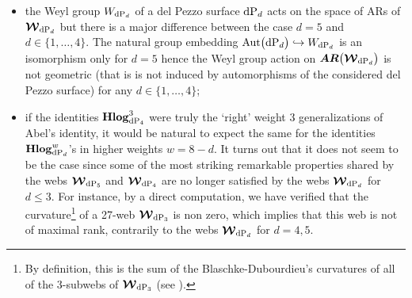 \documentclass[11pt]{amsart}
\newcommand{\mk}{\medskip}
\begin{document}
\begin{itemize}
{ $\pm F= G\circ \gamma$ for some  projective automorphism $\gamma \in {\rm Aut}(\mathbf P^1)={\bf PGL}_2(\mathbf C)$.}
 \mk 
\item[$-$] the Weyl group ${W}_{ {\rm dP}_d } $ of a del Pezzo surface ${\rm dP}_d$ acts on the space of ARs of  $\boldsymbol{\mathcal W}_{ {\rm dP}_d }$ but there is a major difference between the case $d=5$ and 
$d\in \{1,\ldots,4\}$. 
 The natural group embedding ${\rm Aut}\big({\rm dP}_d\big)\hookrightarrow {W}_{ {\rm dP}_d }$ is an  isomorphism only for $d=5$ hence the Weyl group action on $\boldsymbol{AR}\big( \boldsymbol{\mathcal W}_{ {\rm dP}_d }
\big)$ is not geometric (that is is not induced by automorphisms of the considered del Pezzo surface)  
for any $d\in \{1,\ldots,4\}$;
 \mk 
\item[$-$]  if the identities ${\bf Hlog}^{3}_{ {\rm dP}_4}$ were truly the `right' weight 3 generalizations of Abel's identity, it would be natural to expect the same for  the  identities ${\bf Hlog}^{w}_{ {\rm dP}_d}$'s in higher weights 
 $w=8-d$. It turns out that it does not seem to be the case since some of the most striking  remarkable properties shared by the webs $\boldsymbol{\mathcal W}_{ {\rm dP}_5}$ and 
$\boldsymbol{\mathcal W}_{ {\rm dP}_4 }$ 
are no longer satisfied by the webs $\boldsymbol{\mathcal W}_{ {\rm dP}_d}$ for $d\leq 3$. For instance, by a direct computation, we have verified that 
the curvature\footnote{By definition, this is the sum of the Blaschke-Dubourdieu's curvatures of all of 
the   
$3$-subwebs 
of $\boldsymbol{\mathcal W}_{ {\rm dP}_3}$ (see \cite{CL}).} 
of a 27-web $\boldsymbol{\mathcal W}_{ {\rm dP}_3}$ is non zero, which  implies that this web is not of maximal rank, contrarily to the webs $\boldsymbol{\mathcal W}_{ {\rm dP}_d}$ for $d=4,5$.  
\end{itemize}%
\end{document}
